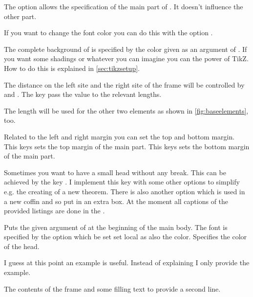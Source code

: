 \documentclass[openany,12pt,tocdepth=3]{ltx-md}
\begin{document}
The option  allows the specification of the main part of .
It doesn't influence the other part. 

If you want to change the font color you can do this with the option .

The complete background of  is specified by the color given
as an argument of . If you want some shadings or whatever
you can imagine you can the power of TikZ. How to do this
is explained in \autoref{sec:tikzsetup}.

The distance on the left site and the right site of the frame will be 
controlled by  and . The 
key  pass the value to the relevant lengths. 

\begin{Note}
The length will be used for the other two elements as shown in 
\autoref{fig:baseelements}, too.
\end{Note}

 Related to the left and right margin you can set the top and bottom margin.
This keys sets the top margin of the main part.
This keys sets the bottom margin of the main part.


Sometimes you want to have a small head without any break. This
can be achieved by the key . I implement this key with 
some other options to simplify e.g. the creating of a new theorem. There
is also another option  which is used in a new coffin and
so put in an extra box. At the moment all captions of the provided listings
are done in the . 


Puts the given argument of  at the beginning
of the main body.
The font is specified by the option  which be set set local as
also the color.
Specifies the color of the head.


I guess at this point an example is useful. Instead of explaining I 
only provide the example.

\begin{ltxexample}[caption={Example main part},label=main,result=true]
 \begin{xframed}[%
   line-width=4pt,line-color=blue,
   inner-margin=1cm,font-color=blue!70,
   head={Example of Head},head-font-color={red!70},
   margin=1.5cm,bg-color=yellow!20,
  ]
   The contents of the frame and some filling text to 
  provide a second line.
 \end{xframed}
\end{ltxexample}
\end{document}
